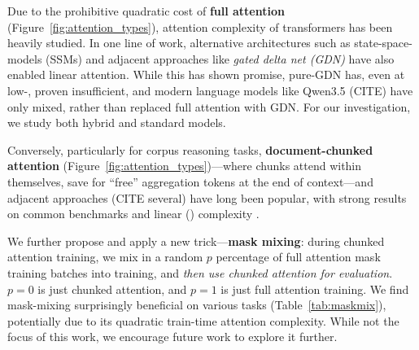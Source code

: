 Due to the prohibitive quadratic cost of \textbf{full attention} (Figure~\ref{fig:attention_types}), attention complexity of transformers has been heavily studied. In one line of work, alternative architectures such as state-space-models (SSMs) \citep{Katharopoulos2020TransformersAR, Gu2023MambaLS} and adjacent approaches like \emph{gated delta net (GDN)} \citep{Yang2024GatedDN} have also enabled linear attention. While this has shown promise, pure-GDN has, even at low-\cname, proven insufficient, and modern language models like Qwen3.5 (CITE) have only mixed, rather than replaced full attention with GDN. For our investigation, we study both hybrid and standard models.

Conversely, particularly for corpus reasoning tasks, \textbf{document-chunked attention} (Figure~\ref{fig:attention_types})---where chunks attend within themselves, save for ``free'' aggregation tokens at the end of context---and adjacent approaches (CITE several) have long been popular, with strong results on common benchmarks and linear () complexity \cite{Beltagy2020LongformerTL}. 

We further propose and apply a new trick---\textbf{mask mixing}: during chunked attention training, we mix in a random $p$ percentage of full attention mask training batches into training, and \emph{then use chunked attention for evaluation}. $p=0$ is just chunked attention, and $p=1$ is just full attention training. We find mask-mixing surprisingly beneficial on various tasks (Table~\ref{tab:maskmix}), potentially due to its quadratic train-time attention complexity.  While not the focus of this work, we encourage future work to explore it further.



